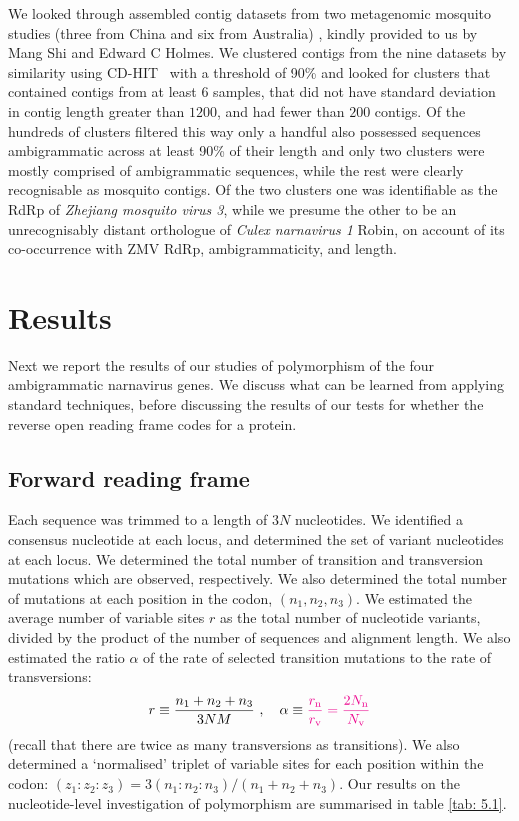 \documentclass[unnumsec,webpdf,contemporary,large,namedate]{oup-authoring-template}%
\theoremstyle{thmstyleone}%
\theoremstyle{thmstyletwo}%
\theoremstyle{thmstylethree}%
\begin{document}
We looked through assembled contig datasets from two metagenomic mosquito
studies (three from China and six from Australia) \citep{shi_16,shi_17}, kindly
provided to us by Mang Shi and Edward C Holmes.  We clustered contigs from the
nine datasets by similarity using CD-HIT~\citep{fu_12} with a threshold of 90\%
and looked for clusters that contained contigs from at least $6$ samples, that
did not have standard deviation in contig length greater than $1 200$, and had
fewer than $200$ contigs.  Of the hundreds of clusters filtered this way only a
handful also possessed sequences ambigrammatic across at least 90\% of their
length and only two clusters were mostly comprised of ambigrammatic sequences,
while the rest were clearly recognisable as mosquito contigs.  Of the two
clusters one was identifiable as the RdRp of \emph{Zhejiang mosquito virus 3}, while
we presume the other to be an unrecognisably distant orthologue of \emph{Culex
narnavirus 1} Robin, on account of its co-occurrence with ZMV RdRp,
ambigrammaticity, and length.

\section{Results}
\label{sec: 5}

Next we report the results of our studies of polymorphism of the four ambigrammatic narnavirus genes.
We discuss what can be learned from applying standard techniques, before discussing
the results of our tests for whether the reverse open reading frame codes for a protein.

\subsection{Forward reading frame}
\label{sec: 5.1}

Each sequence was trimmed to a length of $3N$ nucleotides. We identified a consensus
nucleotide at each locus, and determined the set of variant nucleotides at each locus.
We determined the total number of transition and transversion mutations which are observed,
 respectively. We also determined the total number
of mutations at each position in the codon, $(n_1,n_2,n_3)$.
We estimated the average number of variable sites $r$ as the total number of nucleotide variants,
divided by the product of the number of sequences and alignment length. We also
estimated the ratio $\alpha$ of the rate of selected transition mutations to the rate of transversions:
%
\begin{equation}
\label{eq: 5.1}
r\equiv \frac{n_1+n_2+n_3}{3NM}
\ ,\ \ \
\alpha\equiv {\color{magenta}{\frac{r_{\rm n}}{r_{\rm v}}=\frac{2N_{\rm n}}{N_{\rm v}}}}
\end{equation}
%
(recall that there are twice as many transversions as transitions). We also determined a \lq normalised'
triplet of variable sites for each position within the codon: $(z_1:z_2:z_3)=3(n_1:n_2:n_3)/(n_1+n_2+n_3)$.
Our results on the nucleotide-level
investigation of polymorphism are summarised in table \ref{tab: 5.1}.
\end{document}
